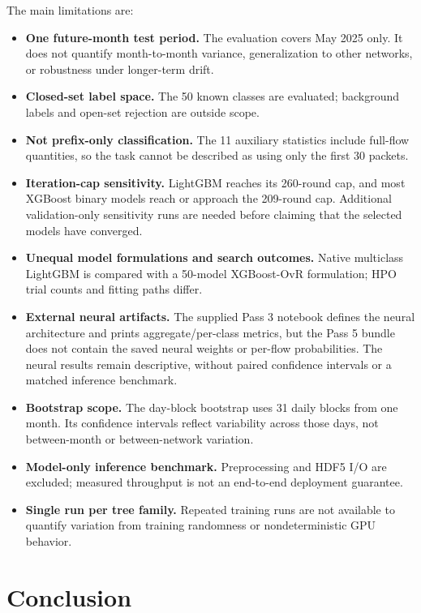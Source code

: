 \documentclass[conference]{IEEEtran}
\begin{document}
The main limitations are:
\begin{itemize}
  \item \textbf{One future-month test period.} The evaluation covers May 2025 only. It does not quantify month-to-month variance, generalization to other networks, or robustness under longer-term drift.
  \item \textbf{Closed-set label space.} The 50 known classes are evaluated; background labels and open-set rejection are outside scope.
  \item \textbf{Not prefix-only classification.} The 11 auxiliary statistics include full-flow quantities, so the task cannot be described as using only the first 30 packets.
  \item \textbf{Iteration-cap sensitivity.} LightGBM reaches its 260-round cap, and most XGBoost binary models reach or approach the 209-round cap. Additional validation-only sensitivity runs are needed before claiming that the selected models have converged.
  \item \textbf{Unequal model formulations and search outcomes.} Native multiclass LightGBM is compared with a 50-model XGBoost-OvR formulation; HPO trial counts and fitting paths differ.
  \item \textbf{External neural artifacts.} The supplied Pass 3 notebook defines the neural architecture and prints aggregate/per-class metrics, but the Pass 5 bundle does not contain the saved neural weights or per-flow probabilities. The neural results remain descriptive, without paired confidence intervals or a matched inference benchmark.
  \item \textbf{Bootstrap scope.} The day-block bootstrap uses 31 daily blocks from one month. Its confidence intervals reflect variability across those days, not between-month or between-network variation.
  \item \textbf{Model-only inference benchmark.} Preprocessing and HDF5 I/O are excluded; measured throughput is not an end-to-end deployment guarantee.
  \item \textbf{Single run per tree family.} Repeated training runs are not available to quantify variation from training randomness or nondeterministic GPU behavior.
\end{itemize}

\section{Conclusion}
\label{sec:conclusion}
\end{document}
